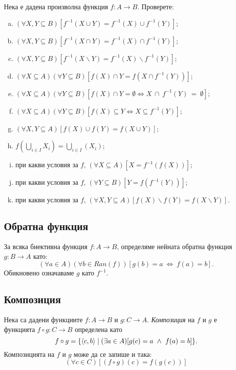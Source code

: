\begin{problem}
  Нека е дадена произволна функция $f:A \to B$.
  Проверете:
  \begin{enumerate}[a)]
  \item
    $(\forall X,Y \subseteq B)[f^{-1}(X\cup Y) = f^{-1}(X)\cup f^{-1}(Y)]$;
  \item
    $(\forall X,Y \subseteq B)[f^{-1}(X\cap Y) = f^{-1}(X)\cap f^{-1}(Y)]$;
  \item
    $(\forall X,Y \subseteq B)[f^{-1}(X\backslash Y) = f^{-1}(X)\backslash f^{-1}(Y)]$;
  \item
    $(\forall X\subseteq A)(\forall Y\subseteq B)[f(X)\cap Y = f(X\cap f^{-1}(Y))]$;
  \item
    $(\forall X \subseteq A)(\forall Y \subseteq B)[f(X)\cap Y = \emptyset \iff  X~\cap~f^{-1}(Y)~=~\emptyset]$;
  \item
    $(\forall X \subseteq A)(\forall Y \subseteq B)[f(X)\subseteq Y \iff X\subseteq f^{-1}(Y)]$;
  \item
    $(\forall X,Y \subseteq A)[f(X)\cup f(Y) = f(X\cup Y)]$;
  \item
    $f(\bigcup_{i\in I}X_i) = \bigcup_{i\in I}(X_i)$;
  \item
    при какви условия за $f$,
    $(\forall X\subseteq A)[X =  f^{-1}(f(X))]$;
  \item
    при какви условия за $f$,
    $(\forall Y \subseteq B)[Y = f(f^{-1}(Y))]$;
  \item
    при какви условия за $f$,
    $(\forall X,Y \subseteq A)[f(X)\backslash f(Y) = f(X\backslash Y)]$.
  \end{enumerate}
\end{problem}

\subsection*{Обратна функция}

За всяка биективна функция $f:A\to B$, определяме нейната обратна функция $g:B \to  A$ като:
\[(\forall a \in A)(\forall b \in Ran(f))[g(b) = a\ \iff\ f(a) = b].\]
Обикновено означаваме $g$ като $f^{-1}$.

\subsection*{Композиция}

Нека са дадени функциите $f:A\to B$ и $g:C\to A$.
{\em Композиция} на $f$ и $g$ е функцията $f\circ g: C \to B$ определена като
\[f\circ g = \{\langle{c,b}\rangle\mid (\exists a\in A)[g(c) = a\ \wedge\ f(a) = b]\}.\]
Композицията на $f$ и $g$ може да се запише и така:
\[(\forall c\in C)[(f\circ g)(c) = f(g(c))]\]

